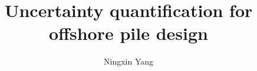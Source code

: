 \documentclass[a4paper,12pt,twoside]{report}
\begin{document}
\title{\LARGE {\bf Uncertainty quantification for offshore pile design}\\
 \vspace*{6mm}
}

\author{Ningxin Yang}



\normallinespacing
\maketitle


%
%
%

\body










\appendix



%



%
\end{document}
